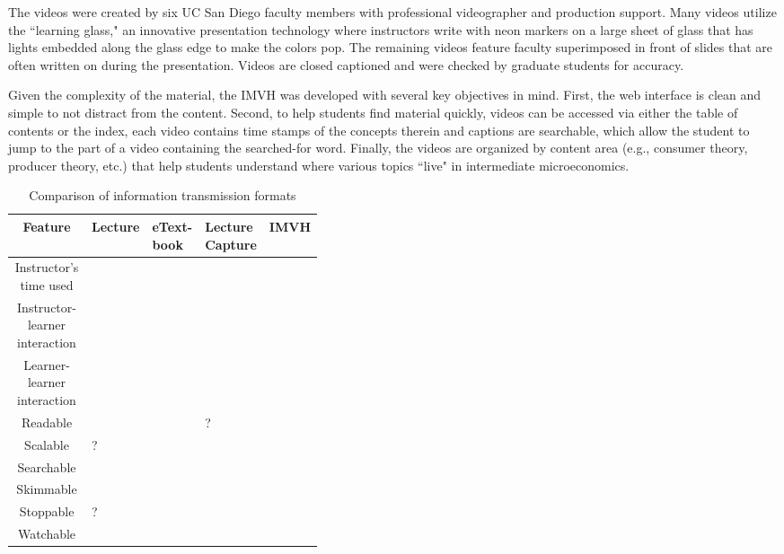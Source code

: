 \documentclass[12pt]{article}
\begin{document}
The videos were created by six UC San Diego faculty members with professional videographer and production support. Many videos utilize the ``learning glass," an innovative presentation technology where instructors write with neon markers on a large sheet of glass that has lights embedded along the glass edge to make the colors pop. The remaining videos feature faculty superimposed in front of slides that are often written on during the presentation. Videos are closed captioned and were checked by graduate students for accuracy.

Given the complexity of the material, the IMVH was developed with several key objectives in mind. First, the web interface is clean and simple to not distract from the content. Second, to help students find material quickly, videos can be accessed via either the table of contents or the index, each video contains time stamps of the concepts therein and captions are searchable, which allow the student to jump to the part of a video containing the searched-for word. Finally, the videos are organized by content area (e.g., consumer theory, producer theory, etc.) that help students understand where various topics ``live" in intermediate microeconomics.



\begin{table}
	\caption{Comparison of information transmission formats} \label{tech_comparison}
	\centering
	\begin{tabular}{|c*{4}{|>{\centering\arraybackslash}m{0.1\linewidth}}|}
		\hline
		Feature & Lecture & eText-book & Lecture Capture & IMVH\\
		\hline
		Instructor's time used & \checkmark & & &\\
		Instructor-learner interaction & \checkmark & & &\\
		Learner-learner interaction & \checkmark & & & \\
		Readable & & \checkmark & ? & \checkmark \\
		Scalable & ? & \checkmark & \checkmark & \checkmark \\
		Searchable & & \checkmark & & \checkmark \\
		Skimmable & & \checkmark & & \checkmark \\
		Stoppable & ? & \checkmark & \checkmark & \checkmark \\
		Watchable & \checkmark & & \checkmark & \checkmark \\

		\hline

	\end{tabular}
	\label{infotransmission}
\end{table}
\end{document}
